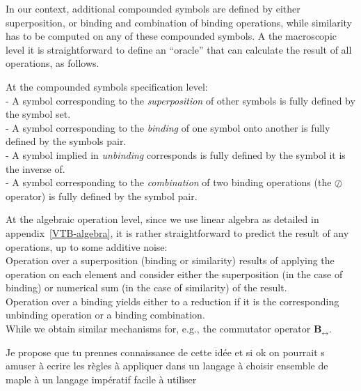 \documentclass[a4]{article}
\newcommand{\vthierry}[2]{{\color{magenta} #1} \sout{#2}}
\begin{document}
In our context, additional compounded symbols are defined by either superposition, or binding and combination of binding operations, while similarity has to be computed on any of these compounded symbols. A the macroscopic level it is straightforward to define an ``oracle'' that can calculate the result of all operations, as follows.

At the compounded symbols specification level:
\\- A symbol corresponding to the {\em superposition} of other symbols is fully defined by the symbol set.
\\- A symbol corresponding to the {\em binding} of one symbol onto another is fully defined by the symbols pair.
\\- A symbol implied in {\em unbinding} corresponds is fully defined by the symbol it is the inverse of.
\\- A symbol corresponding to the {\em combination} of two binding operations (the $\oslash$ operator) is fully defined by the symbol pair.

At the algebraic operation level, since we use linear algebra as detailed in appendix~\ref{VTB-algebra}, it is rather straightforward to predict the result of any operations, up to some additive noise:
\\ Operation over a superposition (binding or similarity) results of applying the operation on each element and consider either the superposition (in the case of binding) or numerical sum (in the case of similarity) of the result.
\\ Operation over a binding yields either to a reduction if it is the corresponding unbinding operation or a binding combination.
\\ While we obtain similar mechanisms for, e.g., the commutator operator $\mathbf{B_{\leftrightarrow}}$.

\vthierry{Je propose que tu prennes connaissance de cette idée et si ok on pourrait s amuser à ecrire les règles à appliquer dans un langage à choisir ensemble de maple à un langage impératif facile à utiliser}




\appendix



%
%

%




%
\end{document}
